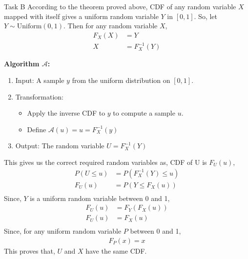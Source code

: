 \begin{task}{Task B}
	According to the theorem proved above, CDF of any random variable $X$
	mapped with itself gives a uniform random variable $Y$ in $[0,1]$. So,
	let $Y\sim \text{Uniform}(0,1)$. Then for any random variable $X$,
	\begin{align}
		F_X(X) & = Y           \\
		X      & = F_X^{-1}(Y)
	\end{align}

	\textbf{Algorithm $\mathcal{A}$:}
	\begin{enumerate}
		\item Input: A sample $y$ from the uniform distribution on
		      $[0,1]$.
		\item Transformation:
		      \begin{itemize}
			      \item Apply the inverse CDF to $y$ to compute a
			            sample $u$.
			      \item Define $\mathcal{A}(u) = u = F_X^{-1}(y)$
		      \end{itemize}
		\item Output: The random variable $U = F_X^{-1}(Y)$
	\end{enumerate}

	This gives us the correct required random variables as, CDF of U is
	$F_U(u)$,
	\begin{align}
		P(U\leq u ) & = P(F_X^{-1}(Y) \leq u) \\
		F_U(u)      & =  P(Y \leq F_X(u))     \\
	\end{align}
	Since, $Y$ is a uniform random variable between 0 and 1,
	\begin{align}
		F_U(u) & =  F_Y(F_X(u)) \\
		F_U(u) & =  F_X(u)      \\
	\end{align}
	Since, for any uniform random variable $P$ between 0 and 1,
	\begin{align}
		F_P(x) = x
	\end{align}
	This proves that, $U$ and $X$ have the same CDF.
\end{task}


